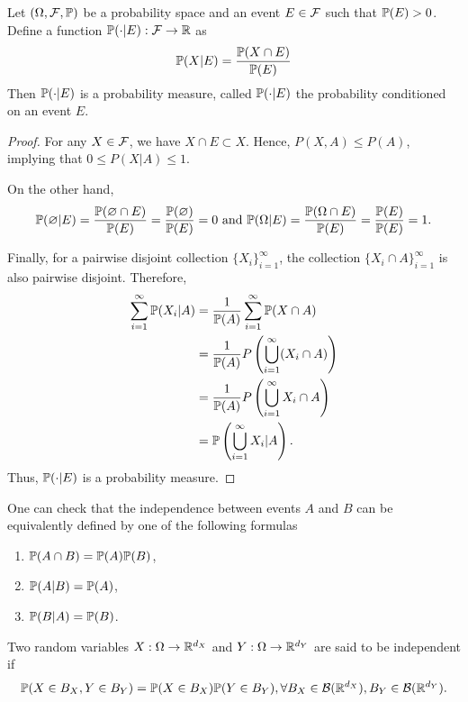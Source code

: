 \begin{theorem}
  Let $(\Omega, \mathcal{F},\mathbb{P})$ be a probability space and an event $E\in\mathcal{F}$ such that $\mathbb{P}(E)>0$. Define a function $\mathbb{P}(\cdot|E):\mathcal{F}\to\mathbb{R}$ as
  \begin{equation}
    \mathbb{P}(X|E) = \dfrac{\mathbb{P}(X\cap E)}{\mathbb{P}(E)}
  \end{equation}
  Then $\mathbb{P}(\cdot|E)$ is a probability measure, called $\mathbb{P}(\cdot|E)$ the probability conditioned on an event $E$.
\end{theorem}

\begin{proof}
  For any $X\in\mathcal{F}$, we have $X\cap E\subset X$. Hence, $P(X,A)\le P(A)$, implying that $0\le P(X|A)\le 1.$

  On the other hand,
  $$\mathbb{P}(\varnothing | E)=\dfrac{\mathbb{P}(\varnothing\cap E)}{\mathbb{P}(E)} = \dfrac{\mathbb{P}(\varnothing)}{\mathbb{P}(E)}=0 \text{ and } \mathbb{P}(\Omega | E) =\dfrac{\mathbb{P}(\Omega\cap E)}{\mathbb{P}(E)} = \dfrac{\mathbb{P}(E)}{\mathbb{P}(E)} = 1.$$

  Finally, for a pairwise disjoint collection $\{X_i\}_{i=1}^\infty$, the collection $\{X_i\cap A\}_{i=1}^\infty$ is also pairwise disjoint. Therefore,
  \begin{align*}
    \sum\limits_{i=1}^\infty \mathbb{P}(X_i|A)
     & = \dfrac{1}{\mathbb{P}(A)}\sum\limits_{i=1}^\infty \mathbb{P}(X\cap A)                \\
     & =\dfrac{1}{\mathbb{P}(A)}P\left(\bigcup\limits_{i=1}^\infty (X_i\cap A)\right) \\
     & =\dfrac{1}{\mathbb{P}(A)}P\left(\bigcup\limits_{i=1}^\infty X_i \cap A \right) \\
     & = \mathbb{P}\left(\bigcup\limits_{i=1}^\infty X_i|A\right).
  \end{align*}
  Thus, $\mathbb{P}(\cdot|E)$ is a probability measure.
\end{proof}

\begin{remark}
  One can check that the independence between events $A$ and $B$ can be equivalently defined by one of the following formulas
  \begin{enumerate}[label=(\arabic*)]
    \item $\mathbb{P}(A \cap B)=\mathbb{P}(A)\mathbb{P}(B)$,
    \item $\mathbb{P}(A | B)=\mathbb{P}(A)$,
    \item $\mathbb{P}(B | A)=\mathbb{P}(B)$.
  \end{enumerate}
\end{remark}

\begin{definition}
  Two random variables $X:\Omega\to\mathbb{R}^{d_X}$ and $Y:\Omega\to\mathbb{R}^{d_Y}$ are said to be independent if
  \begin{equation}
    \label{definition:independent-random-variables}
    \mathbb{P}(X\in B_X, Y\in B_Y)=\mathbb{P}(X\in B_X)\mathbb{P}(Y\in B_Y), \forall B_X\in\mathcal{B}(\mathbb{R}^{d_X}), B_Y\in\mathcal{B}(\mathbb{R}^{d_Y}).
  \end{equation}
\end{definition}

